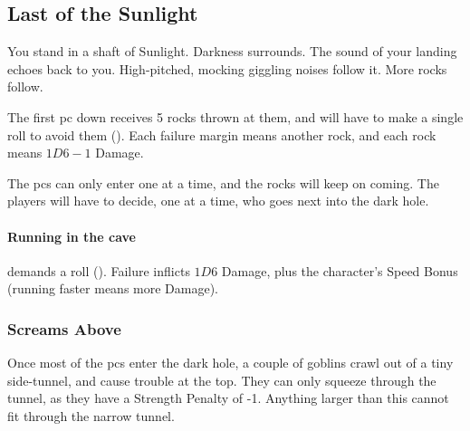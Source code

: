 \begin{multicols}{2}

\subsection{Last of the Sunlight}

\begin{boxtext}
  You stand in a shaft of Sunlight.
  Darkness surrounds.
  The sound of your landing echoes back to you.
  High-pitched, mocking giggling noises follow it.
  More rocks follow.
\end{boxtext}


\noindent
The first \gls{pc} down receives 5 rocks thrown at them, and will have to make a single  roll to avoid them (\tn[10]).
Each failure margin means another rock, and each rock means $1D6-1$ Damage.

The \glspl{pc} can only enter one at a time, and the rocks will keep on coming.
The players will have to decide, one at a time, who goes next into the dark hole.


\paragraph{Running in the cave}
demands a  roll (\tn[12]).
Failure inflicts $1D6$ Damage, plus the character's Speed Bonus (running faster means more Damage).

\subsubsection{Screams Above}

Once most of the \glspl{pc} enter the dark hole, a couple of goblins crawl out of a tiny side-tunnel, and cause trouble at the top.
They can only squeeze through the tunnel, as they have a Strength Penalty of -1.
Anything larger than this cannot fit through the narrow tunnel.


\end{multicols}
